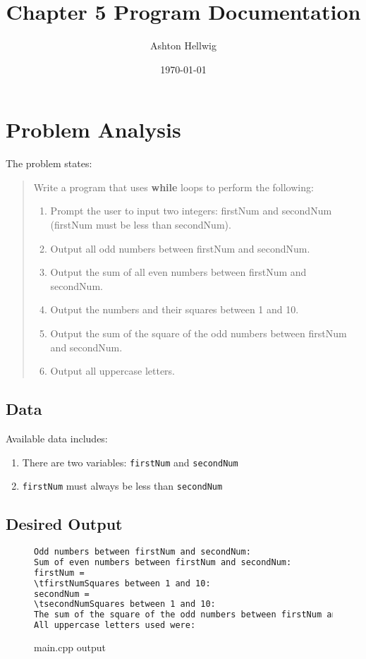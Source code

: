 \documentclass[a4paper]{article}
\title{Chapter 5 Program Documentation}
\author{Ashton Hellwig}
\date\today
\begin{document}
  \maketitle
  \tableofcontents
  \listoffigures
  \newpage


  \section{Problem Analysis}
    The problem states:
    \begin{quotation}
      Write a program that uses \textbf{while} loops to perform the following:
      \begin{enumerate}
        \item Prompt the user to input two integers: firstNum and secondNum
          (firstNum must be less than secondNum).
        \item Output all odd numbers between firstNum and secondNum.
        \item Output the sum of all even numbers between firstNum and secondNum.
        \item Output the numbers and their squares between 1 and 10.
        \item Output the sum of the square of the odd numbers between firstNum
          and secondNum.
        \item Output all uppercase letters.
      \end{enumerate}
    \end{quotation}

    \subsection{Data}
      Available data includes:
      \begin{enumerate}
        \item There are two variables: \texttt{firstNum} and \texttt{secondNum}
        \item \texttt{firstNum} must always be less than \texttt{secondNum}
      \end{enumerate}

    \subsection{Desired Output}
      \begin{figure}[h]
        \caption{main.cpp output}
        \begin{lstlisting}[language=bash]
Odd numbers between firstNum and secondNum:
Sum of even numbers between firstNum and secondNum:
firstNum =
\tfirstNumSquares between 1 and 10: 
secondNum =
\tsecondNumSquares between 1 and 10:
The sum of the square of the odd numbers between firstNum and secondNum =
All uppercase letters used were:
        \end{lstlisting}
        \label{fig:do}
      \end{figure}
\end{document}
